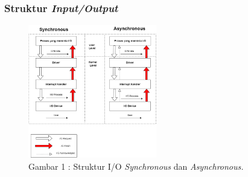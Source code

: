 \documentclass[12pt]{article}
\begin{document}
\subsubsection{Struktur \textit{Input/Output}}
\begin{figure}[h] %
    \centering
    \includegraphics[width=0.5\textwidth]{asset/Struktur_IO.png}
    \captionsetup{labelformat=empty}
    \caption{Gambar 1 : Struktur I/O \emph{Synchronous} dan \emph{Asynchronous.}}
    \label{Gambar 1}
\end{figure}
\end{document}
